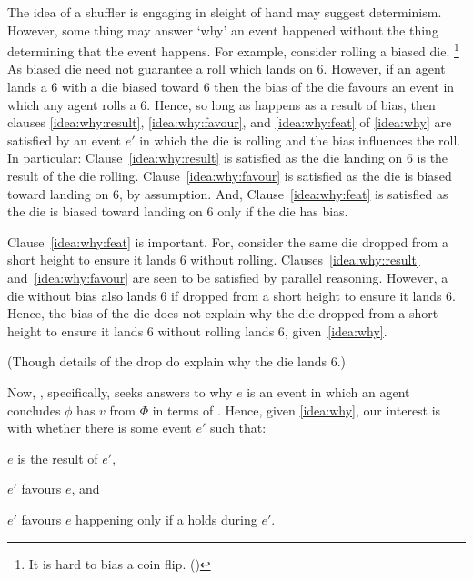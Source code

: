 \begin{note}
  The idea of a shuffler is engaging in sleight of hand may suggest determinism.
  However, some thing may answer `why' an event happened without the thing determining that the event happens.
  For example, consider rolling a biased die.%
  \footnote{
    It is hard to bias a coin flip. (\cite{Gelman:2002ww})
  }
  As biased die need not guarantee a roll which lands on 6.
  However, if an agent lands a 6 with a die biased toward 6 then the bias of the die favours an event in which any agent rolls a 6.
  Hence, so long as happens as a result of bias, then clauses \ref{idea:why:result}, \ref{idea:why:favour}, and \ref{idea:why:feat} of \autoref{idea:why} are satisfied by an event \(e'\) in which the die is rolling and the bias influences the roll.
  In particular:
  Clause~\ref{idea:why:result} is satisfied as the die landing on 6 is the result of the die rolling.
  Clause~\ref{idea:why:favour} is satisfied as the die is biased toward landing on 6, by assumption.
  And, Clause~\ref{idea:why:feat} is satisfied as the die is biased toward landing on 6 only if the die has bias.

  Clause~\ref{idea:why:feat} is important.
  For, consider the same die dropped from a short height to ensure it lands 6 without rolling.
  Clauses~\ref{idea:why:result} and~\ref{idea:why:favour} are seen to be satisfied by parallel reasoning.
  However, a die without bias also lands 6 if dropped from a short height to ensure it lands 6.
  Hence, the bias of the die does not explain why the die dropped from a short height to ensure it lands 6 without rolling lands 6, given~\autoref{idea:why}.

  (Though details of the drop do explain why the die lands 6.)
\end{note}


\begin{note}
  Now, \qWhy{}, specifically, seeks answers to why \(e\) is an event in which an agent concludes \(\phi\) has  \(v\) from \(\Phi\) in terms of .
  Hence, given \autoref{idea:why}, our interest is with whether there is some event \(e'\) such that:
  \begin{enumerate*}[label=]
  \item \(e\) is the result of \(e'\),
  \item \(e'\) favours \(e\), and
  \item \(e'\) favours \(e\) happening only if a \ros{} holds during \(e'\).
  \end{enumerate*}
\end{note}



